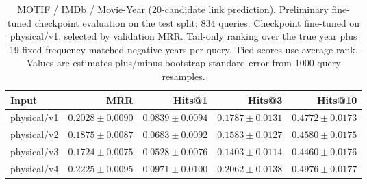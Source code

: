 \begin{table}[t]
\centering
\small
\begin{tabular}{lrrrr}
\toprule
Input & MRR & Hits@1 & Hits@3 & Hits@10 \\
\midrule
physical/v1 & $0.2028 \pm 0.0090$ & $0.0839 \pm 0.0094$ & $0.1787 \pm 0.0131$ & $0.4772 \pm 0.0173$ \\
physical/v2 & $0.1875 \pm 0.0087$ & $0.0683 \pm 0.0092$ & $0.1583 \pm 0.0127$ & $0.4580 \pm 0.0175$ \\
physical/v3 & $0.1724 \pm 0.0075$ & $0.0528 \pm 0.0076$ & $0.1403 \pm 0.0114$ & $0.4460 \pm 0.0176$ \\
physical/v4 & $0.2225 \pm 0.0095$ & $0.0971 \pm 0.0100$ & $0.2062 \pm 0.0138$ & $0.4976 \pm 0.0177$ \\
\bottomrule
\end{tabular}
\caption{MOTIF / IMDb / Movie-Year (20-candidate link prediction). Preliminary fine-tuned checkpoint evaluation on the test split; 834 queries. Checkpoint fine-tuned on physical/v1, selected by validation MRR. Tail-only ranking over the true year plus 19 fixed frequency-matched negative years per query. Tied scores use average rank. Values are estimates plus/minus bootstrap standard error from 1000 query resamples.}
\label{tab:motif-movie_year-link_prediction}
\end{table}

